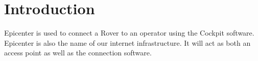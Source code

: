 \section{Introduction}
Epicenter is used to connect a Rover to an operator using the Cockpit software. Epicenter is also the name of our internet infrastructure. It will act as both an access point as well as the connection software.

